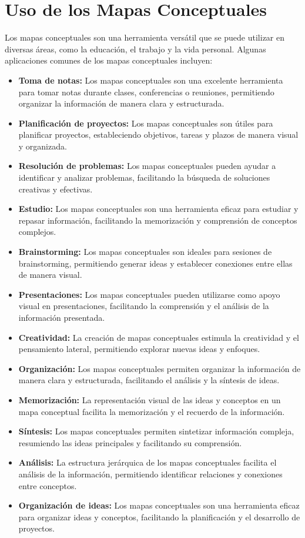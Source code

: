 \documentclass[12pt, a4paper, twoside]{article}
\begin{document}
\section{Uso de los Mapas Conceptuales}
Los mapas conceptuales son una herramienta versátil que se puede utilizar 
en diversas áreas, como la educación, el trabajo y la vida personal. 
Algunas aplicaciones comunes de los mapas conceptuales incluyen:
\begin{itemize}
    \item \textbf{Toma de notas:} Los mapas conceptuales son una excelente herramienta para tomar notas durante clases, conferencias o reuniones, permitiendo organizar la información de manera clara y estructurada.
    \item \textbf{Planificación de proyectos:} Los mapas conceptuales son útiles para planificar proyectos, estableciendo objetivos, tareas y plazos de manera visual y organizada.
    \item \textbf{Resolución de problemas:} Los mapas conceptuales pueden ayudar a identificar y analizar problemas, facilitando la búsqueda de soluciones creativas y efectivas.
    \item \textbf{Estudio:} Los mapas conceptuales son una herramienta eficaz para estudiar y repasar información, facilitando la memorización y comprensión de conceptos complejos.
    \item \textbf{Brainstorming:} Los mapas conceptuales son ideales para sesiones de brainstorming, permitiendo generar ideas y establecer conexiones entre ellas de manera visual.
    \item \textbf{Presentaciones:} Los mapas conceptuales pueden utilizarse como apoyo visual en presentaciones, facilitando la comprensión y el análisis de la información presentada.
    \item \textbf{Creatividad:} La creación de mapas conceptuales estimula la creatividad y el pensamiento lateral, permitiendo explorar nuevas ideas y enfoques.
    \item \textbf{Organización:} Los mapas conceptuales permiten organizar la información de manera clara y estructurada, facilitando el análisis y la síntesis de ideas.
    \item \textbf{Memorización:} La representación visual de las ideas y conceptos en un mapa conceptual facilita la memorización y el recuerdo de la información.
    \item \textbf{Síntesis:} Los mapas conceptuales permiten sintetizar información compleja, resumiendo las ideas principales y facilitando su comprensión.
    \item \textbf{Análisis:} La estructura jerárquica de los mapas conceptuales facilita el análisis de la información, permitiendo identificar relaciones y conexiones entre conceptos.
    \item \textbf{Organización de ideas:} Los mapas conceptuales son una herramienta eficaz para organizar ideas y conceptos, facilitando la planificación y el desarrollo de proyectos.
\end{itemize}
\end{document}
